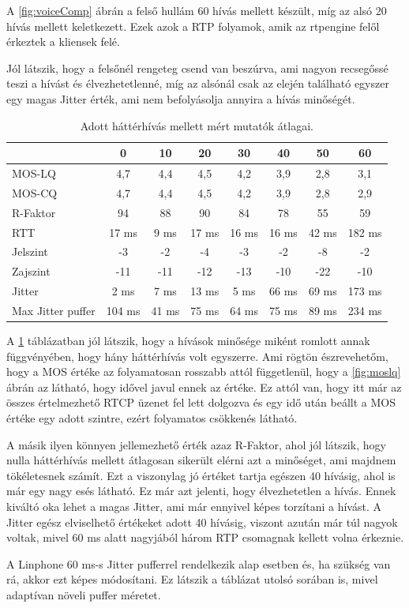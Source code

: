A \ref{fig:voiceComp} ábrán a felső hullám 60 hívás mellett készült, míg az alsó 20 hívás mellett keletkezett. 
Ezek azok a RTP folyamok, amik az rtpengine felől érkeztek a kliensek felé. 

Jól látszik, hogy a felsőnél rengeteg csend van beszúrva, ami nagyon recsegőssé teszi a hívást és élvezhetetlenné,
míg az alsónál csak az elején található egyszer egy magas Jitter érték, ami nem befolyásolja annyira a hívás
minőségét. \\

\begin{table}[H]
	\footnotesize
	\centering
	\begin{tabular}{l c c c c c c c}
		\toprule
		 & 0 & 10 & 20 & 30 & 40 & 50 & 60\\
		\midrule
		MOS-LQ & 4,7 & 4,4 & 4,5 & 4,2 & 3,9 & 2,8 & 3,1\\
		MOS-CQ & 4,7 & 4,4 & 4,5 & 4,2 & 3,9 & 2,8 & 2,9\\
		R-Faktor & 94 & 88 & 90 & 84 & 78 & 55 & 59\\
		RTT & 17 ms & 9 ms & 17 ms & 16 ms & 16 ms & 42 ms & 182 ms\\
		Jelszint & -3 & -2 & -4 & -3 & -2 & -8 & -2\\
		Zajszint & -11 & -11 & -12 & -13 & -10 & -22 & -10\\
		Jitter & 2 ms & 7 ms & 13 ms & 5 ms & 66 ms & 69 ms & 173 ms\\
		Max Jitter puffer & 104 ms & 41 ms & 75 ms & 64 ms & 75 ms & 89 ms & 234 ms\\
		\bottomrule
	\end{tabular}
	\caption{Adott háttérhívás mellett mért mutatók átlagai.}
	\label{tab:callValues}
\end{table}

A \ref{tab:callValues} táblázatban jól látszik, hogy a hívások minősége miként romlott annak függvényében, hogy
hány háttérhívás volt egyszerre. Ami rögtön észrevehetőm, hogy a MOS értéke az folyamatosan rosszabb attól függetlenül,
hogy a \ref{fig:moslq} ábrán az látható, hogy idővel javul ennek az értéke. Ez attól van, hogy itt már az összes 
értelmezhető RTCP üzenet fel lett dolgozva és egy idő után beállt a MOS értéke egy adott szintre, ezért folyamatos 
csökkenés látható. 

A másik ilyen könnyen jellemezhető érték azaz R-Faktor, ahol jól látszik, hogy nulla háttérhívás mellett átlagosan 
sikerült elérni azt a minőséget, ami majdnem tökéletesnek számít. Ezt a viszonylag jó értéket tartja egészen 
40 hívásig, ahol is már egy nagy esés látható. Ez már azt jelenti, hogy élvezhetetlen a hívás. Ennek kiváltó 
oka lehet a magas Jitter, ami már ennyivel képes torzítani a hívást. A Jitter egész elviselhető értékeket adott 
40 hívásig, viszont azután már túl nagyok voltak, mivel 60 ms alatt nagyjából három RTP csomagnak kellett volna érkeznie.

A Linphone 60 ms-s Jitter pufferrel rendelkezik alap esetben és, ha szükség van rá, akkor ezt képes módosítani. Ez
látszik a táblázat utolsó sorában is, mivel adaptívan növeli puffer méretet. 